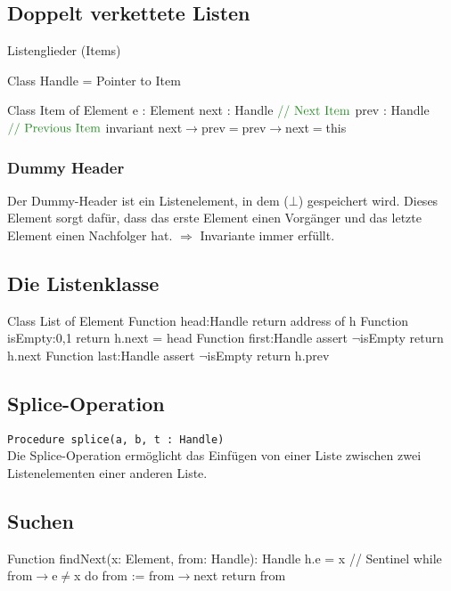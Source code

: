 \subsection{Doppelt verkettete Listen}
Listenglieder (Items)
\begin{PseudoCode}[caption=Doppelt Verkettete Liste]
Class Handle = Pointer to Item

Class Item of Element
    e : Element
    next : Handle   $\textcomment{Next Item}$
    prev : Handle   $\textcomment{Previous Item}$
    invariant next$\rightarrow$prev$=$prev$\rightarrow$next$=$this
\end{PseudoCode}

\subsubsection{Dummy Header}
Der Dummy-Header ist ein Listenelement, in dem  ($\bot$) gespeichert wird. Dieses Element sorgt dafür, dass das erste Element einen Vorgänger und das letzte Element einen Nachfolger hat. $\Rightarrow$ Invariante immer erfüllt.

\subsection{Die Listenklasse}
\begin{PseudoCode}[caption=Listenklasse]
Class List of Element
    Function head:Handle
        return address of h
    Function isEmpty:{0,1}
        return h.next = head
    Function first:Handle
        assert $\neg$isEmpty
        return h.next
    Function last:Handle
        assert $\neg$isEmpty
        return h.prev
\end{PseudoCode}

\subsection{Splice-Operation}
\lstinline[language=Pseudo]|Procedure splice(a, b, t : Handle)|\\
Die Splice-Operation ermöglicht das Einfügen von einer Liste zwischen zwei Listenelementen einer anderen Liste.

\subsection{Suchen}
\begin{PseudoCode}[caption=Simple Suche]
Function findNext(x: Element, from: Handle): Handle
    h.e = x     // Sentinel
    while from$\rightarrow$e$\neq$x do
        from := from$\rightarrow$next
    return from
\end{PseudoCode}

